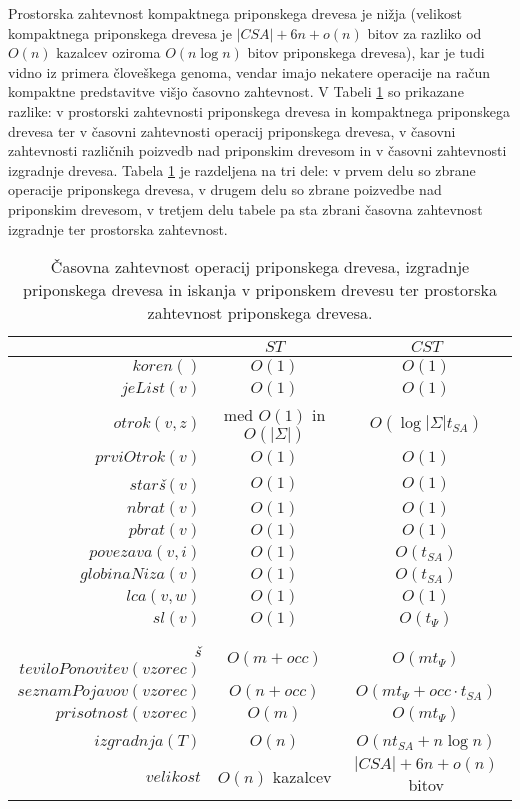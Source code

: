 Prostorska zahtevnost kompaktnega priponskega drevesa je nižja (velikost kompaktnega priponskega drevesa je $|CSA|+6n+o(n)$ bitov za razliko od $O(n)$ kazalcev oziroma $O(n\log{n})$ bitov priponskega drevesa), kar je tudi vidno iz primera človeškega genoma, vendar imajo nekatere operacije na račun kompaktne predstavitve višjo časovno zahtevnost. V Tabeli \ref{tab:PrimerjaST} so prikazane razlike: v prostorski zahtevnosti priponskega drevesa in kompaktnega priponskega drevesa ter  v časovni zahtevnosti operacij priponskega drevesa, v časovni zahtevnosti različnih poizvedb nad priponskim drevesom in v časovni zahtevnosti izgradnje drevesa. Tabela \ref{tab:PrimerjaST} je razdeljena na tri dele: v prvem delu so zbrane operacije priponskega drevesa, v drugem delu so zbrane poizvedbe nad priponskim drevesom, v tretjem delu tabele pa sta zbrani časovna zahtevnost izgradnje ter prostorska zahtevnost.

\begin{table}[htb]
    \centering
    \caption{Časovna zahtevnost operacij priponskega drevesa, izgradnje priponskega drevesa in iskanja v priponskem drevesu ter prostorska zahtevnost priponskega drevesa.}
    \begin{tabular}{rcc}
         &$ST$& $CST$\\\hline
        $koren()$& $O(1)$ & $O(1)$ \\
        $jeList(v)$& $O(1)$ & $O(1)$\\
        $otrok(v,z)$& med $O(1)$ in $O(|\Sigma|)$& $O(\log|\Sigma|t_{SA})$\\
        $prviOtrok(v)$& $O(1)$&$O(1)$\\
        $star$\textit{š}$(v)$& $O(1)$& $O(1)$\\
        $nbrat(v)$& $O(1)$& $O(1)$\\
        $pbrat(v)$& $O(1)$& $O(1)$\\
       
        $povezava(v,i)$& $O(1)$ & $O(t_{SA})$\\
        $globinaNiza(v)$& $O(1)$ & $O(t_{SA})$ \\
        $lca(v,w)$& $O(1)$& $O(1)$\\
        $sl(v)$& $O(1)$& $O(t_\Psi)$ \\
        \\
        \textit{š}$teviloPonovitev(vzorec)$& $O(m+occ)$& $O(mt_{\Psi})$\\
        $seznamPojavov(vzorec)$& $O(n+occ)$ & $O(mt_\Psi +occ\cdot t_{SA})$\\
        $prisotnost(vzorec)$& $O(m)$& $O(mt_{\Psi})$\\
        \\
        $izgradnja(T)$& $O(n)$ & $O(nt_{SA} + n\log{n})$\\
        $velikost$& $O(n)$ kazalcev & $|CSA|+6n+o(n)$ bitov\\
    \end{tabular} 
    \label{tab:PrimerjaST}
\end{table}

